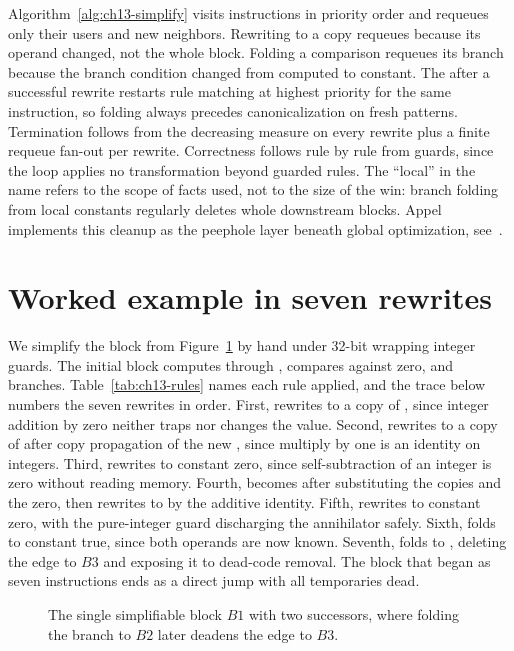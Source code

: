 Algorithm~\ref{alg:ch13-simplify} visits instructions in priority order and requeues only their users and new neighbors.
Rewriting  to a copy requeues  because its operand changed, not the whole block.
Folding a comparison requeues its branch because the branch condition changed from computed to constant.
The  after a successful rewrite restarts rule matching at highest priority for the same instruction, so folding always precedes canonicalization on fresh patterns.
Termination follows from the decreasing measure on every rewrite plus a finite requeue fan-out per rewrite.
Correctness follows rule by rule from guards, since the loop applies no transformation beyond guarded rules.
The \enquote{local} in the name refers to the scope of facts used, not to the size of the win: branch folding from local constants regularly deletes whole downstream blocks.
Appel implements this cleanup as the peephole layer beneath global optimization, see~\cite{appel-1998-modern}.
\section{Worked example in seven rewrites}
\label{sec:ch13-worked}

We simplify the block from Figure~\ref{fig:ch13-block} by hand under 32-bit wrapping integer guards.
The initial block computes  through , compares against zero, and branches.
Table~\ref{tab:ch13-rules} names each rule applied, and the trace below numbers the seven rewrites in order.
First,  rewrites to a copy of , since integer addition by zero neither traps nor changes the value.
Second,  rewrites to a copy of  after copy propagation of the new , since multiply by one is an identity on integers.
Third,  rewrites to constant zero, since self-subtraction of an integer is zero without reading memory.
Fourth,  becomes  after substituting the copies and the zero, then rewrites to  by the additive identity.
Fifth,  rewrites to constant zero, with the pure-integer guard discharging the annihilator safely.
Sixth,  folds to constant true, since both operands are now known.
Seventh,  folds to , deleting the edge to $B3$ and exposing it to dead-code removal.
The block that began as seven instructions ends as a direct jump with all temporaries dead.

\begin{figure}
\caption{The single simplifiable block $B1$ with two successors, where folding the branch to $B2$ later deadens the edge to $B3$.}
\label{fig:ch13-block}
\end{figure}

